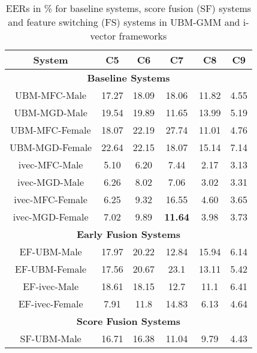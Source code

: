 \documentclass{article}
\begin{document}
\begin{table}[h]
	\centering
	\caption{EERs in \% for baseline systems, score fusion (SF) systems and
	feature switching (FS) systems in UBM-GMM and i-vector frameworks}
	\begin{tabular}{|c|c|c|c|c|c|} \hline
 {\bf System} & {\bf C5 } &  {\bf C6} & {\bf C7} & {\bf C8}  & {\bf C9  }\\ \hline \hline
\multicolumn{6}{|c|}{\bf Baseline Systems} \\ \hline
UBM-MFC-Male & 17.27 & 18.09 & 18.06 & 11.82 & 4.55 \\ \hline

UBM-MGD-Male & 19.54 & 19.89 & 11.65 & 13.99 & 5.19 \\ \hline

{UBM-MFC-Female} & 18.07 & 22.19 & 27.74 & 11.01 & 4.76 \\ \hline

{UBM-MGD-Female} & 22.64 & 22.15 & 18.07 & 15.14 & 7.14 \\ \hline

{ivec-MFC-Male} & 5.10 & 6.20 & 7.44 & 2.17 & 3.13 \\ \hline

{ivec-MGD-Male} &  6.26 & 8.02 & 7.06 & 3.02 & 3.31  \\ \hline

{ivec-MFC-Female} & 6.25 & 9.32 & 16.55 & 4.60 & 3.65 \\ \hline

{ivec-MGD-Female} & 7.02 & 9.89 & {\bf 11.64} & 3.98 & 3.73 \\ \hline 

\multicolumn{6}{|c|}{\bf Early Fusion Systems} \\ \hline

{EF-UBM-Male} & 17.97 & 20.22 & 12.84 & 15.94 & 6.14\\ \hline

{EF-UBM-Female} & 17.56 & 20.67  & 23.1  & 13.11 & 5.42  \\ \hline

{EF-ivec-Male} & 18.61 & 18.15 & 12.7 & 11.1 & 6.41 \\ \hline

{EF-ivec-Female} & 7.91 & 11.8 & 14.83 & 6.13 & 4.64 \\ \hline 

\multicolumn{6}{|c|}{\bf Score Fusion Systems} \\ \hline

SF-UBM-Male & 16.71 & 16.38 & 11.04 & 9.79 & 4.43 \\ 
\hline


\end{tabular}
\end{table}
\end{document}
